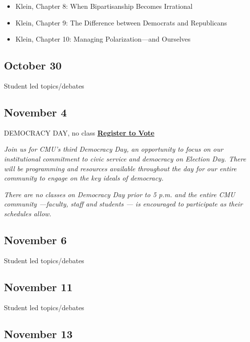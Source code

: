 \documentclass[]{tufte-handout}
\providecommand{\tightlist}{%
  \setlength{\itemsep}{0pt}\setlength{\parskip}{0pt}}
\begin{document}
\begin{itemize}
\tightlist
\item
  Klein, Chapter 8: When Bipartisanship Becomes Irrational
\item
  Klein, Chapter 9: The Difference between Democrats and Republicans
\item
  Klein, Chapter 10: Managing Polarization---and Ourselves
\end{itemize}

\hypertarget{october-30}{%
\subsection{October 30}\label{october-30}}

Student led topics/debates

\hypertarget{november-4}{%
\subsection{November 4}\label{november-4}}

DEMOCRACY DAY, no class
\href{https://www.cmu.edu/student-affairs/slice/civic-engagement/advocacy/voter/index.html}{\textbf{Register
to Vote}}

\emph{Join us for CMU's third Democracy Day, an opportunity to focus on
our institutional commitment to civic service and democracy on Election
Day. There will be programming and resources available throughout the
day for our entire community to engage on the key ideals of democracy.}

\emph{There are no classes on Democracy Day prior to 5 p.m. and the
entire CMU community ---faculty, staff and students --- is encouraged to
participate as their schedules allow.}

\hypertarget{november-6}{%
\subsection{November 6}\label{november-6}}

Student led topics/debates

\hypertarget{november-11}{%
\subsection{November 11}\label{november-11}}

Student led topics/debates

\hypertarget{november-13}{%
\subsection{November 13}\label{november-13}}
\end{document}
